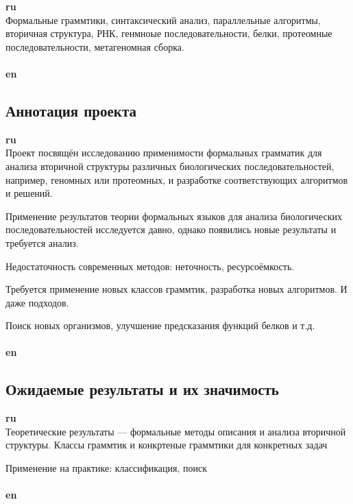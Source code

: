 \documentclass[12pt]{article}  %
\theoremstyle{remark}
\begin{document}
\textbf{ru}\\
Формальные граммтики, синтаксический анализ, параллельные алгоритмы, вторичная структура, РНК, генмноые последовательности, белки, протеомные последовательности, метагеномная сборка.
\\
\\
\textbf{en}\\


\subsection{Аннотация проекта }
\textbf{ru}\\
Проект посвящён исследованию применимости формальных грамматик для анализа вторичной структуры различных биологических последовательностей, например, геномных или протеомных, и разработке соответствующих алгоритмов и решений.


Применение результатов теории формальных языков для анализа биологических последовательностей исследуется давно, однако появились новые результаты и требуется анализ.

Недостаточность современных методов: неточность, ресурсоёмкость.

Требуется применение новых классов граммтик, разработка новых алгоритмов.
И даже подходов.

Поиск новых организмов, улучшение предсказания функций белков и т.д.
\\
\\
\textbf{en}\\


\subsection{Ожидаемые результаты и их значимость}

\textbf{ru}\\
Теоретические результаты --- формальные методы описания и анализа вторичной структуры.
Классы граммтик и конкртеные граммтики для конкретных задач

Применение на практике: классификация, поиск
\\
\\
\textbf{en}\\
\end{document}
